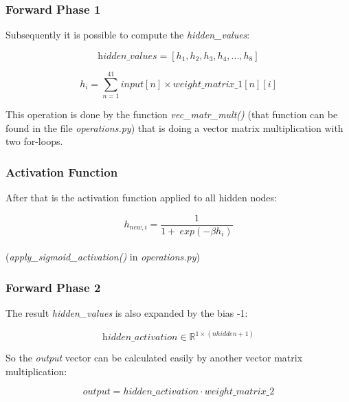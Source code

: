 \documentclass[10pt,a4paper]{article}
\begin{document}
	\subsubsection{Forward Phase 1}
	Subsequently it is possible to compute the \textit{hidden\_values}:
	\begin{center}
		\begin{equation}
		\textit{hidden\_values} = [h_1,h_2,h_3,h_4,...,h_8]
		\end{equation} 
	\end{center}

	\begin{center}
		\begin{equation}
		h_i = \sum_{n=1}^{41} input[n] \times weight\_matrix\_1[n][i] 
		\end{equation} 
	\end{center}
	This operation is done by the function \textit{ vec\_matr\_mult()} (that function can be found in the file \textit{operations.py}) that is doing a vector matrix multiplication with two for-loops. \\
	\subsubsection{Activation Function}
	After that is the activation function applied to all hidden nodes:
	\begin{center}
		\begin{equation}
		h_{new, i} = \frac{1}{1 + \ exp(-\beta h_i)} 
		\end{equation} 
		\\ (\textit{apply\_sigmoid\_activation()} in \textit{operations.py})
	\end{center}
	\subsubsection{Forward Phase 2}
	The result \textit{hidden\_values} is also expanded by the bias -1: 
	\begin{center}
		\begin{equation}
		\textit{hidden\_activation} \in \mathbb{R}^{1\times (nhidden +1)} 
		\end{equation} 
	\end{center}
	 So the \textit{output} vector can be calculated easily by another vector matrix multiplication:
	  \begin{center}
	  	\begin{equation}
	  	\textit{output} = hidden\_activation \cdot weight\_matrix\_2 
	  	\end{equation} 
	  \end{center}
\end{document}
